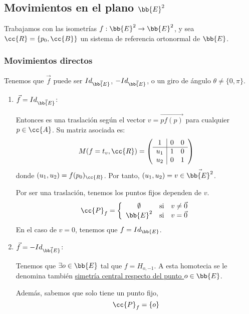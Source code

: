 \subsection{Movimientos en el plano $\bb{E}^2$}
Trabajamos con las isometrías $f:\bb{E}^2\to \bb{E}^2$, y sea $\cc{R}=\{p_0, \cc{B}\}$ un sistema de referencia ortonormal de $\bb{E}$.

\subsubsection{Movimientos directos}
Tenemos que $\vec{f}$ puede ser $Id_{\vec{\bb{E}}}$, $-Id_{\vec{\bb{E}}}$, o un giro de ángulo $\theta\neq \{0,\pi\}$.
\begin{enumerate}
    \item $\vec{f}=Id_{\vec{\bb{E}}}$:
    
    Entonces es una traslación según el vector $v=\vec{pf(p)}$ para cualquier $p\in \cc{A}$. Su matriz asociada es:
    \begin{equation*}
        M(f=t_v,\cc{R}) = \left(\begin{array}{c|cc}
            1 & 0 & 0 \\ \hline
            u_1 & 1 & 0 \\ 
            u_2 & 0 & 1
        \end{array}\right)
    \end{equation*}
    donde $(u_1,u_2)=f(p_0)_{\cc{R}}$. Por tanto, $(u_1, u_2)=v\in \vec{\bb{E}^2}$.

    Por ser una traslación, tenemos los puntos fijos dependen de $v$.
    \begin{equation*}
        \cc{P}_f = \left\{\begin{array}{ccc}
            \emptyset & \text{si} & v\neq \vec{0} \\
            \bb{E}^2 & \text{si} & v=\vec{0}
        \end{array}\right.
    \end{equation*}
    En el caso de $v=0$, tenemos que $f=Id_{\bb{E}}$.
    
    \item $\vec{f}=-Id_{\vec{\bb{E}}}$:

    Tenemos que $\exists o\in \bb{E}$ tal que $f=H_{o,-1}$. A esta homotecia se le denomina también \ul{simetría central respecto del punto $o\in \bb{E}$}.

    Además, sabemos que solo tiene un punto fijo,
    \begin{equation*}
        \cc{P}_f = \{o\}
    \end{equation*}


\end{enumerate}
